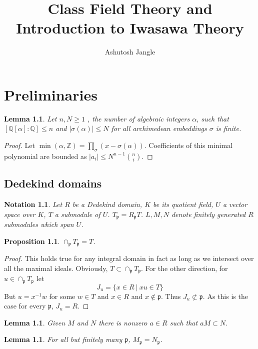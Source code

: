 \documentclass[twoside, 12pt]{iiser-thesis}
\title{Class Field Theory and Introduction to Iwasawa Theory}
\author{Ashutosh Jangle}
\newtheorem{prop}[thm]{ Proposition}
\newtheorem{lem}[thm]{ Lemma}
\newtheorem{notation}{ Notation}[section]
\newcommand{\Z}{\mathbb{Z}}
\newcommand{\Q}{\mathbb{Q}}
\begin{document}
	\thesisfront
	

\chapter{Preliminaries}
\begin{lem}\label{coeffbound}
Let $n,N \geq 1$ , the number of algebraic integers $\alpha$, such that $[ \Q [\alpha ]:\Q ] \leq n $ and $|\sigma (\alpha ) | \leq N$ for all archimedean embeddings $\sigma$ is finite.
\end{lem}
\begin{proof}
Let $\min (\alpha , \Z )= \prod _\sigma (x-\sigma (\alpha ))$. Coefficients of this minimal polynomial are bounded as $|a_i | \leq N^{n-1} {n \choose i}$. 
\end{proof} 




\section{Dedekind domains}

\begin{notation}
    Let $R$ be a Dedekind domain, $K$ be its quotient field, $U$ a vector space over $K$, $T$ a submodule of $U$. $T_\mathfrak p = R_\mathfrak p T$. $L,M,N$ denote finitely generated $R$ submodules which span $U$.
\end{notation}
\begin{prop}
$\cap _\mathfrak p T_\mathfrak p = T$.
\end{prop}	
\begin{proof}
This holds true for any integral domain in fact as long as we intersect over all the maximal ideals.
\newline 
Obviously, $T \subset \cap _\mathfrak p T_\mathfrak p$. For the other direction, for $u\in \cap _\mathfrak p T_\mathfrak p$ let $$ J_u = \{x \in R \ \big | \  xu \in T \}$$ But $u=x^{-1}w$ for some $w\in T$ and $x \in R$ and $x\notin \mathfrak p$. Thus $J_u \not \subset \mathfrak p$. As this is the case for every $\mathfrak p$, $J_u=R$. 
\end{proof}
\begin{lem}
Given $M$ and $N$ there is nonzero $a\in R$ such that $aM \subset N$.
\end{lem}
\begin{lem}
For all but finitely many $\mathfrak p$, $M_\mathfrak p = N_\mathfrak p$.
\end{lem}
\end{document}

